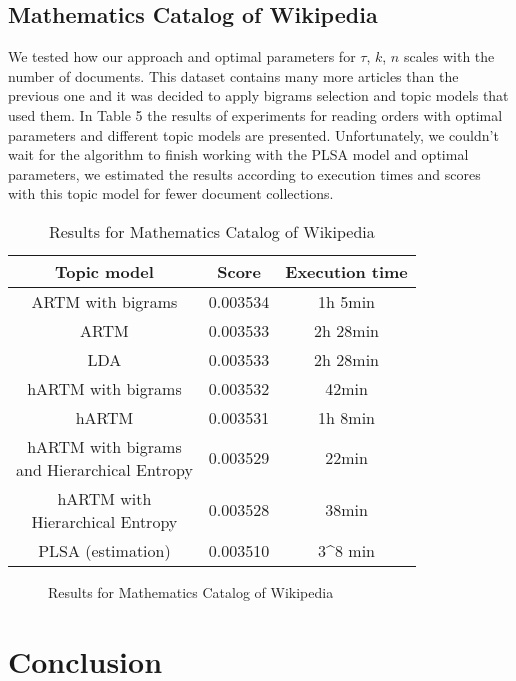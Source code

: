 \documentclass[12pt,twoside]{article}
\begin{document}
	\subsection{Mathematics Catalog of Wikipedia}
	We tested how our approach and optimal parameters for $\tau$, $k$, $n$ scales with the number of documents. This dataset contains many more articles than the previous one and it was decided to apply bigrams selection and topic models that used them. In Table 5 the results of experiments for reading orders with optimal parameters and different topic models are presented. Unfortunately, we couldn't wait for the algorithm to finish working with the PLSA model and optimal parameters, we estimated the results according to execution times and scores with this topic model for fewer document collections.
	
	\begin{table}[H]
	\centering
    \begin{tabular}{|c|c|c|}
    \hline
    Topic model & Score & Execution time\\
    \hline
    ARTM with bigrams & 0.003534 & 1h 5min \\
    ARTM & 0.003533 & 2h 28min \\
    LDA & 0.003533 & 2h 28min \\
    hARTM with bigrams & 0.003532 & 42min \\
    hARTM & 0.003531 & 1h 8min \\
    \specialcell{hARTM with bigrams \\ and Hierarchical Entropy} & 0.003529 & 22min \\
    \specialcell{hARTM with \\ Hierarchical Entropy} & 0.003528 & 38min \\
    PLSA (estimation) & 0.003510 & 3\cdot 10^8 min \\
    \hline
    \end{tabular}
    \caption{Results for Mathematics Catalog of Wikipedia}
	\end{table}
	
	\begin{figure}
    \centering
	\caption{Results for Mathematics Catalog of Wikipedia}
	\end{figure}
	
	\section{Conclusion}
	
\end{document}

